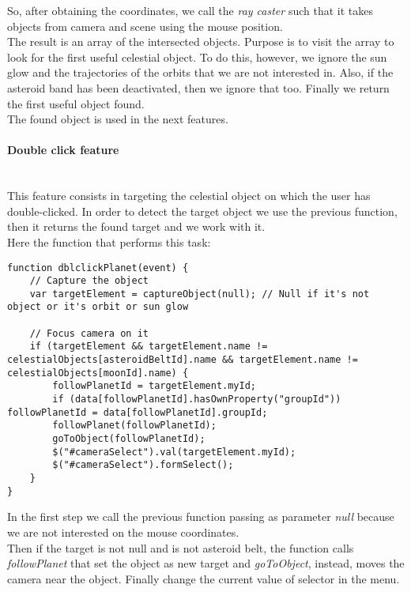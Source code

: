 \documentclass{article}
\begin{document}
So, after obtaining the coordinates, we call the \textit{ray caster} such that it takes objects from camera and scene using the mouse position.\\
The result is an array of the intersected objects. Purpose is to visit the array to look for the first useful celestial object. To do this, however, we ignore the sun glow and the trajectories of the orbits that we are not interested in. Also, if the asteroid band has been deactivated, then we ignore that too. Finally we return the first useful object found.\\
The found object is used in the next features.
\paragraph{Double click feature}\mbox{}\\
This feature consists in targeting the celestial object on which the user has double-clicked. In order to detect the target object we use the previous function, then it returns the found target and we work with it.\\
Here the function that performs this task:
\begin{lstlisting}
function dblclickPlanet(event) {
	// Capture the object
	var targetElement = captureObject(null); // Null if it's not object or it's orbit or sun glow
	
	// Focus camera on it
	if (targetElement && targetElement.name != celestialObjects[asteroidBeltId].name && targetElement.name != celestialObjects[moonId].name) {
		followPlanetId = targetElement.myId;
		if (data[followPlanetId].hasOwnProperty("groupId")) followPlanetId = data[followPlanetId].groupId;
		followPlanet(followPlanetId);
		goToObject(followPlanetId);
		$("#cameraSelect").val(targetElement.myId);
		$("#cameraSelect").formSelect();
	}
}
\end{lstlisting}
In the first step we call the previous function passing as parameter \textit{null} because we are not interested on the mouse coordinates.\\
Then if the target is not null and is not asteroid belt, the function calls \textit{followPlanet} that set the object as new target and \textit{goToObject}, instead, moves the camera near the object. Finally change the current value of selector in the menu.
\end{document}
